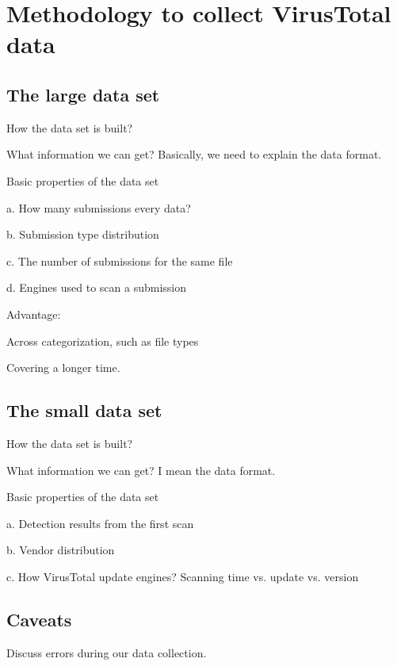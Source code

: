 \section{Methodology to collect VirusTotal data}

\subsection{The large data set}

How the data set is built?

What information we can get? Basically, we need to explain the data format. 

Basic properties of the data set

a. How many submissions every data?

b. Submission type distribution

c. The number of submissions for the same file

d. Engines used to scan a submission 

Advantage: 

Across categorization, such as file types 

Covering a longer time.


\subsection{The small data set}

How the data set is built?

What information we can get? I mean the data format. 

Basic properties of the data set 

a. Detection results from the first scan

b. Vendor distribution

c. How VirusTotal update engines? Scanning time vs. update vs. version 

\subsection{Caveats}

Discuss errors during our data collection. 
